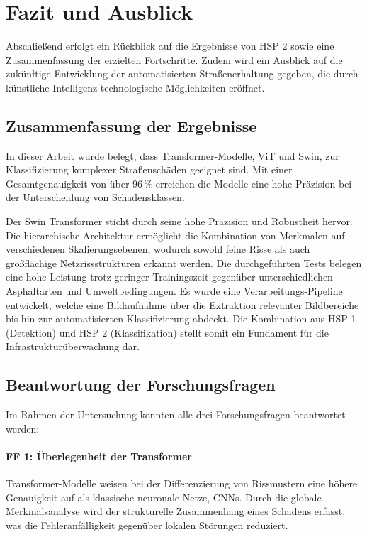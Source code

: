 \section{Fazit und Ausblick}
\label{sec:fazit}

Abschließend erfolgt ein Rückblick auf die Ergebnisse von HSP 2 sowie eine Zusammenfassung der erzielten Fortschritte. Zudem wird ein Ausblick auf die zukünftige Entwicklung der automatisierten Straßenerhaltung gegeben, die durch künstliche Intelligenz technologische Möglichkeiten eröffnet.

\subsection{Zusammenfassung der Ergebnisse}
\label{subsec:zusammenfassung_ergebnisse}

In dieser Arbeit wurde belegt, dass Transformer-Modelle, ViT und Swin, zur Klassifizierung komplexer Straßenschäden geeignet sind. Mit einer Gesamtgenauigkeit von über 96\,\% erreichen die Modelle eine hohe Präzision bei der Unterscheidung von Schadensklassen.

 Der Swin Transformer sticht durch seine hohe Präzision und Robustheit hervor. Die hierarchische Architektur ermöglicht die Kombination von Merkmalen auf verschiedenen Skalierungsebenen, wodurch sowohl feine Risse als auch großflächige Netzrissstrukturen erkannt werden. Die durchgeführten Tests belegen eine hohe Leistung trotz geringer Trainingszeit gegenüber unterschiedlichen Asphaltarten und Umweltbedingungen. Es wurde eine Verarbeitungs-Pipeline entwickelt, welche eine Bildaufnahme über die Extraktion relevanter Bildbereiche bis hin zur automatisierten Klassifizierung abdeckt. Die Kombination aus HSP 1 (Detektion) und HSP 2 (Klassifikation) stellt somit ein Fundament für die Infrastrukturüberwachung dar.

\subsection{Beantwortung der Forschungsfragen}
\label{subsec:beantwortung_ff}

Im Rahmen der Untersuchung konnten alle drei Forschungsfragen beantwortet werden:

\paragraph{FF 1: Überlegenheit der Transformer}
Transformer-Modelle weisen bei der Differenzierung von Rissmustern eine höhere Genauigkeit auf als klassische neuronale Netze, CNNs. Durch die globale Merkmalsanalyse wird der strukturelle Zusammenhang eines Schadens erfasst, was die Fehleranfälligkeit gegenüber lokalen Störungen reduziert.

